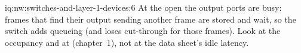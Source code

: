\begin{solution}{iq:nw:switches-and-layer-1-devices:6}
At the open the output ports are busy: frames that find their output sending another frame are stored and wait, so the switch adds
queueing (and loses cut-through for those frames). Look at the  occupancy and at  (chapter~1), not at the
data sheet's idle latency.
\end{solution}
